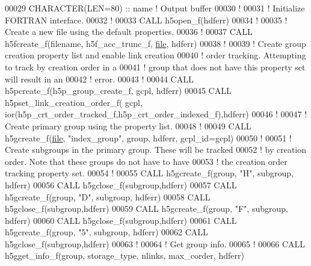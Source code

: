 \begin{DoxyCode}
00029   \textcolor{keywordtype}{CHARACTER(LEN=80)} :: name \textcolor{comment}{! Output buffer}
00030   \textcolor{comment}{!}
00031   \textcolor{comment}{! Initialize FORTRAN interface.}
00032   \textcolor{comment}{!}
00033   \textcolor{keyword}{CALL }h5open\_f(hdferr)
00034   \textcolor{comment}{!}
00035   \textcolor{comment}{! Create a new file using the default properties.}
00036   \textcolor{comment}{!}
00037   \textcolor{keyword}{CALL }h5fcreate\_f(filename, h5f\_acc\_trunc\_f, \hyperlink{structfile}{file}, hdferr)
00038   \textcolor{comment}{!}
00039   \textcolor{comment}{! Create group creation property list and enable link creation}
00040   \textcolor{comment}{! order tracking.  Attempting to track by creation order in a}
00041   \textcolor{comment}{! group that does not have this property set will result in an}
00042   \textcolor{comment}{! error.}
00043   \textcolor{comment}{!}
00044   \textcolor{keyword}{CALL }h5pcreate\_f(h5p\_group\_create\_f, gcpl, hdferr)
00045   \textcolor{keyword}{CALL }h5pset\_link\_creation\_order\_f( gcpl, ior(h5p\_crt\_order\_tracked\_f,h5p\_crt\_order\_indexed\_f),hdferr)
00046   \textcolor{comment}{!}
00047   \textcolor{comment}{! Create primary group using the property list.}
00048   \textcolor{comment}{!}
00049   \textcolor{keyword}{CALL }h5gcreate\_f(\hyperlink{structfile}{file}, \textcolor{stringliteral}{"index\_group"}, group, hdferr, gcpl\_id=gcpl)
00050   \textcolor{comment}{!}
00051   \textcolor{comment}{! Create subgroups in the primary group.  These will be tracked}
00052   \textcolor{comment}{! by creation order.  Note that these groups do not have to have}
00053   \textcolor{comment}{! the creation order tracking property set.}
00054   \textcolor{comment}{!}
00055   \textcolor{keyword}{CALL }h5gcreate\_f(group, \textcolor{stringliteral}{"H"}, subgroup, hdferr)
00056   \textcolor{keyword}{CALL }h5gclose\_f(subgroup,hdferr)
00057   \textcolor{keyword}{CALL }h5gcreate\_f(group, \textcolor{stringliteral}{"D"}, subgroup, hdferr)
00058   \textcolor{keyword}{CALL }h5gclose\_f(subgroup,hdferr)
00059   \textcolor{keyword}{CALL }h5gcreate\_f(group, \textcolor{stringliteral}{"F"}, subgroup, hdferr)
00060   \textcolor{keyword}{CALL }h5gclose\_f(subgroup,hdferr)
00061   \textcolor{keyword}{CALL }h5gcreate\_f(group, \textcolor{stringliteral}{"5"}, subgroup, hdferr)
00062   \textcolor{keyword}{CALL }h5gclose\_f(subgroup,hdferr)
00063   \textcolor{comment}{!}
00064   \textcolor{comment}{! Get group info.}
00065   \textcolor{comment}{!}
00066   \textcolor{keyword}{CALL }h5gget\_info\_f(group, storage\_type, nlinks, max\_corder, hdferr)

\end{DoxyCode}
